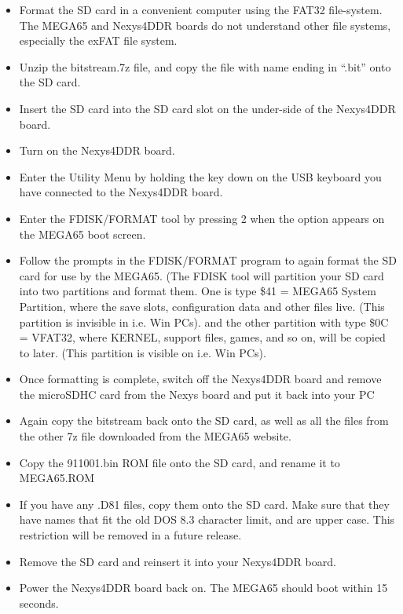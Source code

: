 \begin{itemize}
  \item{Format the SD card}  in a convenient computer using the FAT32 file-system.  The MEGA65 and Nexys4DDR boards do not understand other
file systems, especially the exFAT file system.
\item{Unzip} the bitstream.7z file, and copy the file with name ending in ``.bit'' onto the SD card.
\item{Insert} the SD card into the SD card slot on the under-side of the Nexys4DDR board.
\item{Turn on} the Nexys4DDR board.
\item{Enter the Utility Menu} by holding the  key down on the USB keyboard you have connected to the Nexys4DDR board.
\item{Enter the FDISK/FORMAT tool} by pressing 2 when the option appears on the MEGA65 boot screen.
\item{Follow the prompts} in the FDISK/FORMAT program to again format the SD card for use by the MEGA65.
  (The FDISK tool will partition your SD card into two partitions and format them.
  One is type \$41 = MEGA65 System Partition, where the save slots, configuration data and other files live.
  (This partition is invisible in i.e. Win PCs).
  and the other partition with type \$0C = VFAT32, where KERNEL, support files, games, and so on, will be copied to later.
  (This partition is visible on i.e. Win PCs).
\item{Once formatting is complete}, switch off the Nexys4DDR board and remove the microSDHC card from the Nexys board and put it back into your PC
\item{Again copy} the bitstream back onto the SD card, as well as all the files from the other 7z file downloaded from the MEGA65 website.
\item{Copy the 911001.bin} ROM file onto the SD card, and rename it to MEGA65.ROM
\item{If you have any .D81 files}, copy them onto the SD card. Make sure that they have names that fit the old DOS 8.3 character limit, and are upper case.  This restriction will be removed in a future release.
\item{Remove the SD card} and reinsert it into your Nexys4DDR board.
\item{Power the Nexys4DDR} board back on.  The MEGA65 should boot within 15 seconds.
\end{itemize}


